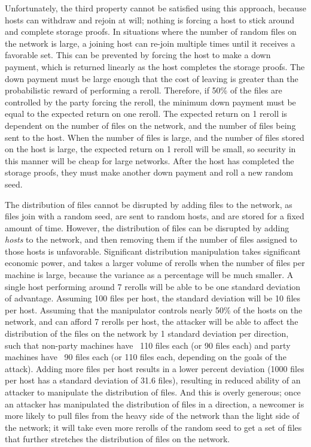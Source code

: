 \documentclass[twocolumn]{article}
\begin{document}
Unfortunately, the third property cannot be satisfied using this approach, because hosts can withdraw and rejoin at will; nothing is forcing a host to stick around and complete storage proofs.
In situations where the number of random files on the network is large, a joining host can re-join multiple times until it receives a favorable set.
This can be prevented by forcing the host to make a down payment, which is returned linearly as the host completes the storage proofs.
The down payment must be large enough that the cost of leaving is greater than the probabilistic reward of performing a reroll.
Therefore, if 50\% of the files are controlled by the party forcing the reroll, the minimum down payment must be equal to the expected return on one reroll.
The expected return on 1 reroll is dependent on the number of files on the network, and the number of files being sent to the host.
When the number of files is large, and the number of files stored on the host is large, the expected return on 1 reroll will be small, so security in this manner will be cheap for large networks.
After the host has completed the storage proofs, they must make another down payment and roll a new random seed.

The distribution of files cannot be disrupted by adding files to the network, as files join with a random seed, are sent to random hosts, and are stored for a fixed amount of time.
However, the distribution of files can be disrupted by adding \textit{hosts} to the network, and then removing them if the number of files assigned to those hosts is unfavorable.
Significant distribution manipulation takes significant economic power, and takes a larger volume of rerolls when the number of files per machine is large, because the variance as a percentage will be much smaller.
A single host performing around 7 rerolls will be able to be one standard deviation of advantage.
Assuming 100 files per host, the standard deviation will be 10 files per host.
Assuming that the manipulator controls nearly 50\% of the hosts on the network, and can afford 7 rerolls per host, the attacker will be able to affect the distribution of the files on the network by 1 standard deviation per direction, such that non-party machines have ~110 files each (or 90 files each) and party machines have ~90 files each (or 110 files each, depending on the goals of the attack).
Adding more files per host results in a lower percent deviation (1000 files per host has a standard deviation of 31.6 files), resulting in reduced ability of an attacker to manipulate the distribution of files.
And this is overly generous; once an attacker has manipulated the distribution of files in a direction, a newcomer is more likely to pull files from the heavy side of the network than the light side of the network; it will take even more rerolls of the random seed to get a set of files that further stretches the distribution of files on the network.
\end{document}
